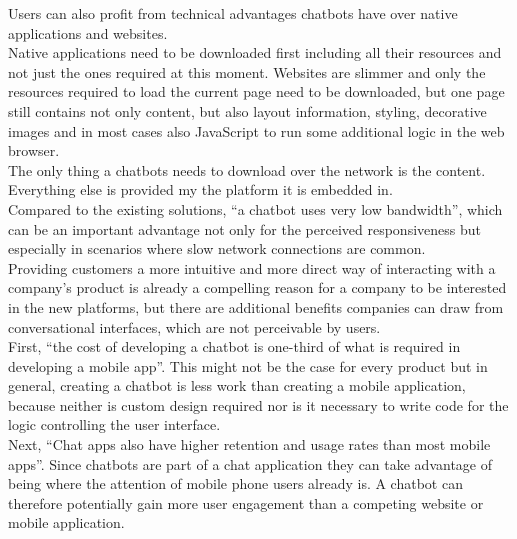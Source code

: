 Users can also profit from technical advantages chatbots have over native applications and websites.
\\
Native applications need to be downloaded first including all their resources and not just the ones required at this moment.
Websites are slimmer and only the resources required to load the current page need to be downloaded,
but one page still contains not only content, but also layout information, styling, decorative images and in most cases also JavaScript to run some additional logic in the web browser.
\\
The only thing a chatbots needs to download over the network is the content.
Everything else is provided my the platform it is embedded in.
\\
Compared to the existing solutions, ``a chatbot uses very low bandwidth''\cite{techinasia}, which can be an important advantage not only for the perceived responsiveness but especially in scenarios where slow network connections are common.
\\

Providing customers a more intuitive and more direct way of interacting with a company's product is already a compelling reason for a company to be interested in the new platforms, but there are additional benefits companies can draw from conversational interfaces, which are not perceivable by users.
\\

First, ``the cost of developing a chatbot is one-third of what is required in developing a mobile app''\cite{techinasia}.
This might not be the case for every product but in general, creating a chatbot is less work than creating a mobile application, because neither is custom design required nor is it necessary to write code for the logic controlling the user interface.
\\

Next, ``Chat apps also have higher retention and usage rates than most mobile apps''\cite{businessinsider}.
Since chatbots are part of a chat application they can take advantage of being where the attention of mobile phone users already is.
A chatbot can therefore potentially gain more user engagement than a competing website or mobile application.
\\

